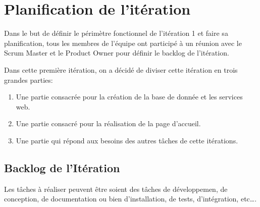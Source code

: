 

\section{Planification de l'itération}

Dans le but de définir le périmètre fonctionnel de l'itération 1 et faire sa
planification, tous les membres de l'équipe ont participé à un réunion avec le
Scrum Master et le Product Owner pour définir le backlog de l'itération.

Dans cette première itération, on a décidé de diviser cette itération en trois
grandes parties:

\begin{enumerate}
    \item Une partie consacrée pour la création de la base de donnée et les
        services web.
    \item Une partie consacré pour la réalisation de la page d'accueil.
    \item Une partie qui répond aux besoins des autres tâches de cette
        itérations.
\end{enumerate}

\subsection{Backlog de l'Itération}

Les tâches à réaliser peuvent être soient des tâches de développemen, de conception, de documentation
ou bien
d'installation, de tests, d'intégration, etc\ldots.



